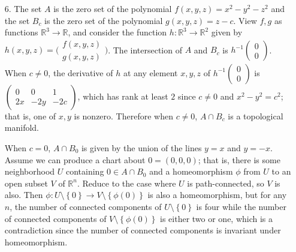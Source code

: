\documentclass[11pt,leqno]{article}
\theoremstyle{plain}
\theoremstyle{definition}
\numberwithin{equation}{section}
\numberwithin{lem}{section}
\newcommand{\cbr}[1]{\left\{#1\right\}}
\begin{document}
\begin{enumerate}
\begin{enumerate}
    \end{enumerate}
    \item[6.] The set $A$ is the zero set of the polynomial $f(x,y,z) = x^2-y^2-z^2$ and the set $B_c$ is the zero set of the polynomial $g(x,y,z) = z-c$. View $f,g$ as functions $\mathbb R^3\to \mathbb R$, and consider the function $h\colon \mathbb R^3\to\mathbb R^2$ given by $h(x,y,z) = \big(\!\begin{smallmatrix}
      f(x,y,z) \\ g(x,y,z)
    \end{smallmatrix}\!\big)$. The intersection of $A$ and $B_c$ is $h^{-1}(\!\begin{smallmatrix}
      0 \\ 0
    \end{smallmatrix}\!)$. When $c\neq 0$, the derivative of $h$ at any element $x,y,z$ of $h^{-1}(\!\begin{smallmatrix}
      0 \\ 0
    \end{smallmatrix}\!)$ is $(\!\begin{smallmatrix}
      0 & 0 & 1 \\ 2x & -2y & -2c
    \end{smallmatrix}\!)$, which has rank at least $2$ since $c\neq 0 $ and $x^2-y^2 = c^2$; that is, one of $x,y$ is nonzero. Therefore when $c\neq 0$, $A\cap B_c$ is a topological manifold. 

    When $c = 0$, $A\cap B_0$ is given by the union of the lines $y = x$ and $y = -x$. Assume we can produce a chart about $0 = (0,0,0)$; that is, there is some neighborhood $U$ containing $0\in A\cap B_0$ and a homeomorphism $\phi$ from $U$ to an open subset $V$ of $\mathbb R^n$. Reduce to the case where $U$ is path-connected, so $V$ is also. Then $\phi\colon U\setminus\cbr{0}\to V\setminus\cbr{\phi(0)}$ is also a homeomorphism, but for any $n$, the number of connected components of $U\setminus\cbr{0}$ is four while the number of connected components of $V\setminus\cbr{\phi(0)}$ is either two or one, which is a contradiction since the number of connected components is invariant under homeomorphism.
\end{enumerate}
\end{document}
